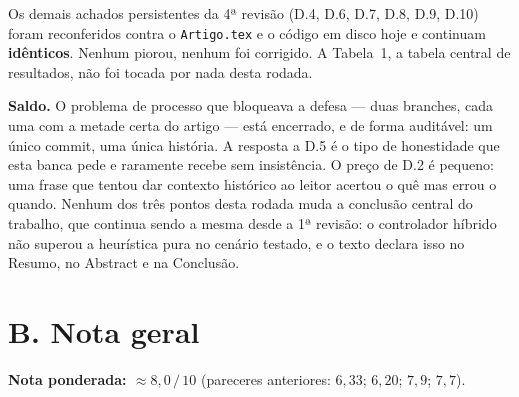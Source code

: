 \documentclass[11pt,a4paper]{article}
\begin{document}
Os demais achados persistentes da 4ª revisão (D.4, D.6, D.7, D.8, D.9, D.10) foram reconferidos contra
o \texttt{Artigo.tex} e o código em disco hoje e continuam \textbf{idênticos}. Nenhum piorou, nenhum
foi corrigido. A Tabela~1, a tabela central de resultados, não foi tocada por nada desta rodada.

\textbf{Saldo.} O problema de processo que bloqueava a defesa --- duas branches, cada uma com a metade
certa do artigo --- está encerrado, e de forma auditável: um único commit, uma única história. A
resposta a D.5 é o tipo de honestidade que esta banca pede e raramente recebe sem insistência. O preço
de D.2 é pequeno: uma frase que tentou dar contexto histórico ao leitor acertou o quê mas errou o
quando. Nenhum dos três pontos desta rodada muda a conclusão central do trabalho, que continua sendo a
mesma desde a 1ª revisão: o controlador híbrido não superou a heurística pura no cenário testado, e o
texto declara isso no Resumo, no Abstract e na Conclusão.

\section*{B. Nota geral}

\textbf{Nota ponderada: $\approx 8{,}0\,/\,10$} \quad (pareceres anteriores: $6{,}33$; $6{,}20$; $7{,}9$;
$7{,}7$).
\end{document}
